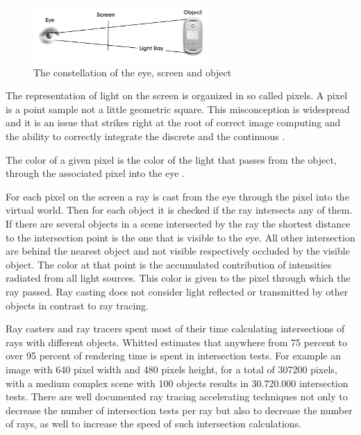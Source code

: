 \documentclass[DIV10, abstracton, openright, footsepline, headsepline, twoside, 9pt,
bigheadings]{scrreprt}
\begin{document}
\begin{figure}[H]
\centering
\includegraphics[width=0.6\textwidth]{bilder/eye_screen_object}
\caption{The constellation of the eye, screen and object}
\label{fig:eyescrobj}
\end{figure}


The representation of light on the screen is organized in so called pixels.
A pixel is a point sample not a little geometric square. This misconception
is widespread and it is an issue that strikes right at the root of correct
image computing and the ability to correctly integrate the discrete and the
continuous \cite{AlvyRaySmith95}.

The color of a given pixel is the color of the light that passes from the
object, through the associated pixel into the eye \cite{Hearn94}.

For each pixel on the screen a ray is cast from the eye through the pixel into
the virtual world. Then for each object it is checked if the ray intersects any
of them. If there are several objects in a scene intersected by the ray the
shortest distance to the intersection point is the one that is visible to the
eye. All other intersection are behind the nearest object and not visible
respectively occluded by the visible object. The color at that point is the
accumulated contribution of intensities radiated from all light sources. This
color is given to the pixel through which the ray passed. Ray casting does not
consider light reflected or transmitted by other objects in contrast to ray
tracing.

Ray casters and ray tracers spent most of their time calculating
intersections of rays with different objects. Whitted \cite{Whitted80}
estimates that anywhere from 75 percent to over 95 percent of rendering time
is spent in intersection tests.  For example an image with 640 pixel width  and
480 pixels height, for a total of 307200 pixels, with a medium complex scene
with 100 objects results in 30.720.000 intersection tests. There are well
documented ray tracing accelerating techniques not only to decrease the number
of intersection tests per ray but also to decrease the number of rays, as well
to increase the speed of such intersection calculations.
\end{document}

